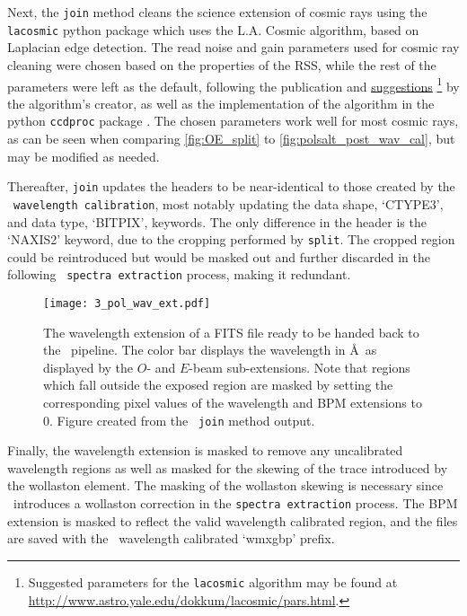 Next, the \texttt{join} method cleans the science extension of cosmic rays using the \texttt{lacosmic} python package which uses the L.A. Cosmic algorithm, based on Laplacian edge detection. The read noise and gain parameters used for cosmic ray cleaning were chosen based on the properties of the \gls{RSS}, while the rest of the parameters were left as the default, following the publication and \href{http://www.astro.yale.edu/dokkum/lacosmic/pars.html}{suggestions}%
\footnote{Suggested parameters for the \texttt{lacosmic} algorithm may be found at \url{http://www.astro.yale.edu/dokkum/lacosmic/pars.html}.}
by the algorithm's creator, as well as the implementation of the algorithm in the python \texttt{ccdproc} package \citep{lacosmic,astroscrappy}. The chosen parameters work well for most cosmic rays, as can be seen when comparing \autoref{fig:OE_split} to \autoref{fig:polsalt_post_wav_cal}, but may be modified as needed.

Thereafter, \texttt{join} updates the headers to be near-identical to those created by the \polsalt\ \texttt{wavelength calibration}, most notably updating the data shape, `CTYPE3', and data type, `BITPIX', keywords.
The only difference in the header is the  `NAXIS2' keyword, due to the cropping performed by \texttt{split}. The cropped region could be reintroduced but would be masked out and further discarded in the following \polsalt\ \texttt{spectra extraction} process, making it redundant.

\begin{figure}[t]
    \centering
    \texttt{[image: 3\_pol\_wav\_ext.pdf]}
    \caption{The wavelength extension of a \gls{FITS} file ready to be handed back to the \polsalt\ pipeline. The color bar displays the wavelength in \AA\ as displayed by the $O$- and $E$-beam sub-extensions. Note that regions which fall outside the exposed region are masked by setting the corresponding pixel values of the wavelength and \gls{BPM} extensions to $0$. Figure created from the \stops\ \texttt{join} method output.}
    \label{fig:pol_wav_ext}
\end{figure}

Finally, the wavelength extension is masked to remove any uncalibrated wavelength regions as well as masked for the skewing of the trace introduced by the wollaston element. The masking of the wollaston skewing is necessary since \polsalt\ introduces a wollaston correction in the \texttt{spectra extraction} process. The \gls{BPM} extension is masked to reflect the valid wavelength calibrated region, and the files are saved with the \polsalt\ wavelength calibrated `wmxgbp' prefix.

